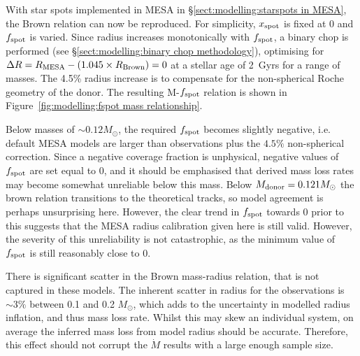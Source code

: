 With star spots implemented in MESA in \S\ref{sect:modelling:starspots in MESA}, the Brown relation can now be reproduced.
For simplicity, $x_{\rm spot}$ is fixed at 0 and $f_{\rm spot}$ is varied.
Since radius increases monotonically with $f_{\rm spot}$, a binary chop is performed (see \S\ref{sect:modelling:binary chop methodology}), optimising for $\Delta R=R_{\rm MESA}-(1.045\times R_{\rm Brown})=0$ at a stellar age of 2~Gyrs for a range of masses. The 4.5\% radius increase is to compensate for the non-spherical Roche geometry of the donor.
The resulting M-$f_{\rm spot}$ relation is shown in Figure~\ref{fig:modelling:fspot mass relationship}.

Below masses of $\sim 0.12 M_\odot$, the required $f_{\rm spot}$ becomes slightly negative, i.e. default MESA models are larger than observations plus the $4.5\%$ non-spherical correction.
Since a negative coverage fraction is unphysical, negative values of $f_{\rm spot}$ are set equal to 0, and it should be emphasised that derived mass loss rates may become somewhat unreliable below this mass.
Below $M_{\rm donor} = 0.121 M_\odot$ the brown relation transitions to the \citet{baraffe2015} theoretical tracks, so model agreement is perhaps unsurprising here. However, the clear trend in $f_{\rm spot}$ towards 0 prior to this suggests that the MESA radius calibration given here is still valid.
However, the severity of this unreliability is not catastrophic, as the minimum value of $f_{\rm spot}$ is still reasonably close to 0.

There is significant scatter in the Brown mass-radius relation, that is not captured in these models. The inherent scatter in radius for the observations is $\sim 3\%$ between 0.1 and 0.2 $M_\odot$, which adds to the uncertainty in modelled radius inflation, and thus mass loss rate.
Whilst this may skew an individual system, on average the inferred mass loss from model radius should be accurate. Therefore, this effect should not corrupt the $\dot M$ results with a large enough sample size.

